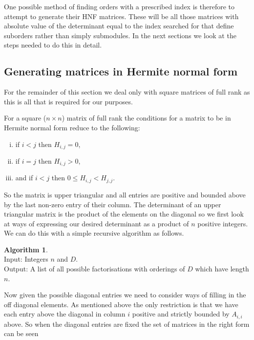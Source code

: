 \documentclass[12pt,a4paper,abstracton,bibtotoc]{scrreprt}
\theoremstyle{definition}
\newtheorem{alg}{Algorithm}
\begin{document}
One possible method of finding orders with a prescribed index is therefore to attempt to generate their HNF matrices.
These will be all those matrices with absolute value of the determinant equal to the index searched for that define suborders rather than simply submodules.
In the next sections we look at the steps needed to do this in detail.

\subsection{Generating matrices in Hermite normal form}
For the remainder of this section we deal only with square matrices of full rank as this is all that is required for our purposes.

For a square ($n\times n$) matrix of full rank the conditions for a matrix to be in Hermite normal form reduce to the following:
\begin{enumerate}[i)]
\item if $i < j$ then $H_{i,j} = 0$,
\item if $i = j$ then $H_{i,j} > 0$,
\item and if $i < j$ then $0\le H_{i,j} < H_{j,j}$.
\end{enumerate}%
So the matrix is upper triangular and all entries are positive and bounded above by the last non-zero entry of their column.
The determinant of an upper triangular matrix is the product of the elements on the diagonal so we first look at ways of expressing our desired determinant as a product of $n$ positive integers.
We can do this with a simple recursive algorithm as follows.

\begin{alg}~\\
Input: Integers $n$ and $D$.\\
Output: A list of all possible factorisations with orderings of $D$ which have length $n$.\\
\begin{algorithm}[H]
\end{algorithm}
\end{alg}

Now given the possible diagonal entries we need to consider ways of filling in the off diagonal elements.
As mentioned above the only restriction is that we have each entry above the diagonal in column $i$ positive and strictly bounded by $A_{i,i}$ above.
So when the diagonal entries are fixed the set of matrices in the right form can be seen 
\end{document}
